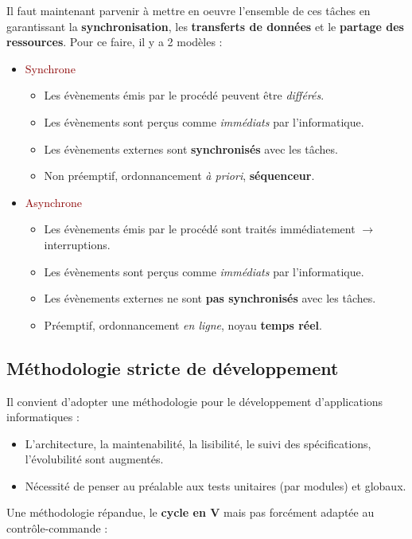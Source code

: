 \documentclass{article}
\newcommand{\red}[1]{\textcolor{darkred}{#1}}
\begin{document}
\noindent Il faut maintenant parvenir à mettre en oeuvre l'ensemble de ces tâches en garantissant la 
\textbf{synchronisation}, les \textbf{transferts de données} et le \textbf{partage des ressources}. Pour ce
faire, il y a 2 modèles :
\begin{itemize}
\item \red{Synchrone}
	\begin{itemize}
	\item Les évènements émis par le procédé peuvent être \textit{différés}.
	\item Les évènements sont perçus comme \textit{immédiats} par l'informatique.
	\item Les évènements externes sont \textbf{synchronisés} avec les tâches.
	\item Non préemptif, ordonnancement \textit{à priori}, \textbf{séquenceur}.
	\end{itemize}
\item \red{Asynchrone}
	\begin{itemize}
	\item Les évènements émis par le procédé sont traités immédiatement $\rightarrow$ interruptions.
	\item Les évènements sont perçus comme \textit{immédiats} par l'informatique.
	\item Les évènements externes ne sont \textbf{pas synchronisés} avec les tâches.
	\item Préemptif, ordonnancement \textit{en ligne}, noyau \textbf{temps réel}.
	\end{itemize}
\end{itemize}

\subsection{Méthodologie stricte de développement}

Il convient d'adopter une méthodologie pour le développement d’applications informatiques :
\begin{itemize}
\item L’architecture, la maintenabilité, la lisibilité, le suivi des spécifications, l’évolubilité sont 
augmentés.
\item Nécessité de penser au préalable aux tests unitaires (par modules) et globaux.
\end{itemize}

Une méthodologie répandue, le \textbf{cycle en V} mais pas forcément adaptée au contrôle-commande :
\end{document}
